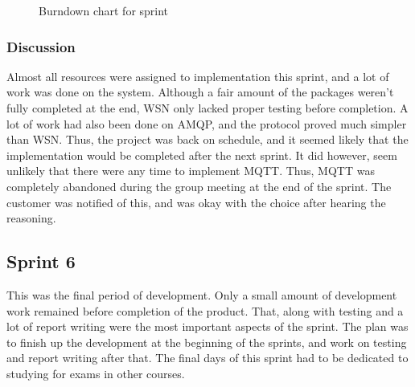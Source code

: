 \begin{center}
  \begin{figure}[ht!]
    \caption{Burndown chart for sprint }
    \label{fig:sprint 5, burndown}
  \end{figure}
\end{center}


\subsubsection{Discussion}
\label{subsec:project_lifecycle-development-sprint_5-discussion}

Almost all resources were assigned to implementation this sprint, and a lot of work was done on the system. Although a fair amount of the packages weren't fully completed at the end, WSN only lacked proper testing before completion. A lot of work had also been done on AMQP, and the protocol proved much simpler than WSN. Thus, the project was back on schedule, and it seemed likely that the implementation would be completed after the next sprint. It did however, seem unlikely that there were any time to implement MQTT. Thus, MQTT was completely abandoned during the group meeting at the end of the sprint. The customer was notified of this, and was okay with the choice after hearing the reasoning.

\subsection{Sprint 6}
\label{subsec:project_lifecycle-development-sprint_6}

This was the final period of development. Only a small amount of development work remained before completion of the product. That, along with testing and a lot of report writing were the most important aspects of the sprint. The plan was to finish up the development at the beginning of the sprints, and work on testing and report writing after that. The final days of this sprint had to be dedicated to studying for exams in other courses.


